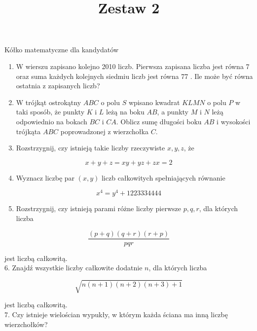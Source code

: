 \documentclass[10pt]{article}
\title{Zestaw 2 }
\author{}
\date{}
\begin{document}
\maketitle
Kółko matematyczne dla kandydatów

\begin{enumerate}
  \item W wierszu zapisano kolejno 2010 liczb. Pierwsza zapisana liczba jest równa 7 oraz suma każdych kolejnych siedmiu liczb jest równa 77 . Ile może być równa ostatnia z zapisanych liczb?
  \item W trójkąt ostrokątny \(A B C\) o polu \(S\) wpisano kwadrat \(K L M N\) o polu \(P\) w taki sposób, że punkty \(K\) i \(L\) leżą na boku \(A B\), a punkty \(M\) i \(N\) leżą odpowiednio na bokach \(B C\) i \(C A\). Oblicz sumę długości boku \(A B\) i wysokości trójkąta \(A B C\) poprowadzonej z wierzchołka \(C\).
  \item Rozstrzygnij, czy istnieją takie liczby rzeczywiste \(x, y, z\), że
\end{enumerate}

\[
x+y+z=x y+y z+z x=2
\]

\begin{enumerate}
  \setcounter{enumi}{3}
  \item Wyznacz liczbę par \((x, y)\) liczb całkowitych spełniających równanie
\end{enumerate}

\[
x^{4}=y^{4}+1223334444
\]

\begin{enumerate}
  \setcounter{enumi}{4}
  \item Rozstrzygnij, czy istnieją parami różne liczby pierwsze \(p, q, r\), dla których liczba
\end{enumerate}

\[
\frac{(p+q)(q+r)(r+p)}{p q r}
\]

jest liczbą całkowitą.\\
6. Znajdź wszystkie liczby całkowite dodatnie \(n\), dla których liczba

\[
\sqrt{n(n+1)(n+2)(n+3)+1}
\]

jest liczbą całkowitą.\\
7. Czy istnieje wielościan wypukły, w którym każda ściana ma inną liczbę wierzchołków?
\end{document}
